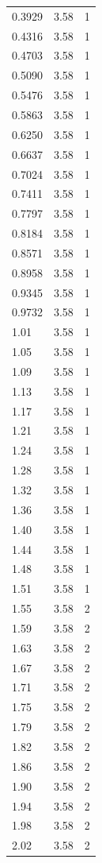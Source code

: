 \begin{longtable}{lrr}
  0.3929 & 3.58 & 1 \\
  0.4316 & 3.58 & 1 \\
  0.4703 & 3.58 & 1 \\
  0.5090 & 3.58 & 1 \\
  0.5476 & 3.58 & 1 \\
  0.5863 & 3.58 & 1 \\
  0.6250 & 3.58 & 1 \\
  0.6637 & 3.58 & 1 \\
  0.7024 & 3.58 & 1 \\
  0.7411 & 3.58 & 1 \\
  0.7797 & 3.58 & 1 \\
  0.8184 & 3.58 & 1 \\
  0.8571 & 3.58 & 1 \\
  0.8958 & 3.58 & 1 \\
  0.9345 & 3.58 & 1 \\
  0.9732 & 3.58 & 1 \\
  1.01 & 3.58 & 1 \\
  1.05 & 3.58 & 1 \\
  1.09 & 3.58 & 1 \\
  1.13 & 3.58 & 1 \\
  1.17 & 3.58 & 1 \\
  1.21 & 3.58 & 1 \\
  1.24 & 3.58 & 1 \\
  1.28 & 3.58 & 1 \\
  1.32 & 3.58 & 1 \\
  1.36 & 3.58 & 1 \\
  1.40 & 3.58 & 1 \\
  1.44 & 3.58 & 1 \\
  1.48 & 3.58 & 1 \\
  1.51 & 3.58 & 1 \\
  1.55 & 3.58 & 2 \\
  1.59 & 3.58 & 2 \\
  1.63 & 3.58 & 2 \\
  1.67 & 3.58 & 2 \\
  1.71 & 3.58 & 2 \\
  1.75 & 3.58 & 2 \\
  1.79 & 3.58 & 2 \\
  1.82 & 3.58 & 2 \\
  1.86 & 3.58 & 2 \\
  1.90 & 3.58 & 2 \\
  1.94 & 3.58 & 2 \\
  1.98 & 3.58 & 2 \\
  2.02 & 3.58 & 2 \\

\end{longtable}
